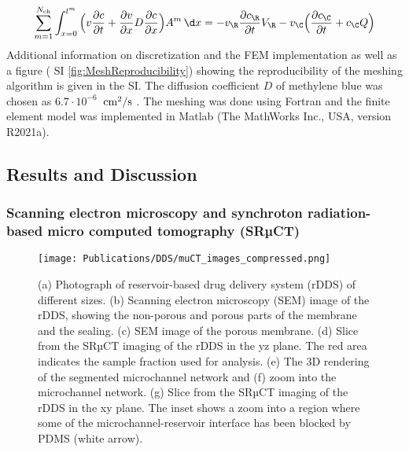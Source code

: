 \begin{align}
  \sum_{m=1}^{N_{\rm ch}} \int_{x=0}^{l^m}  \Big( v\frac{\partial c}{\partial t} + \frac{\partial v}{\partial x}D\frac{\partial c}{\partial x} \Big) A^m \, \d x = -v_\R \frac{\partial c_\R}{\partial t} V_\R - v_\C \Big( \frac{\partial c_\C}{\partial t} + c_\C Q\Big)
\end{align}
Additional information on discretization and the FEM implementation as well as a figure ( SI \cref{fig:MeshReproducibility}) showing the reproducibility of the meshing algorithm is given in the SI. The diffusion coefficient $D$ of methylene blue was chosen as $6.7\cdot10^{-6}$~${\rm cm^2/s}$ \supercite{selifonov2019determination}. The meshing was done using Fortran and the finite element model was implemented in Matlab (The MathWorks Inc., USA, version R2021a).

\subsection{Results and Discussion}
\subsubsection{Scanning electron microscopy and synchroton radiation-based micro computed tomography (SRµCT)}
\begin{figure}[h!]
  \centering
  \texttt{[image: Publications/DDS/muCT\_images\_compressed.png]}
  \caption{(a) Photograph of reservoir-based drug delivery system (rDDS) of different sizes. (b) Scanning electron microscopy (SEM) image of the rDDS, showing the non-porous and porous parts of the membrane and the sealing. (c) SEM image of the porous membrane. (d) Slice from the SRµCT imaging of the rDDS in the yz plane. The red area indicates the sample fraction used for analysis. (e) The 3D rendering of the segmented microchannel network and (f) zoom into the microchannel network. (g) Slice from the SRµCT imaging of the rDDS in the xy plane. The inset shows a zoom into a region where some of the microchannel-reservoir interface has been blocked by PDMS (white arrow).}
  \label{fig:muCT_images}
\end{figure}

